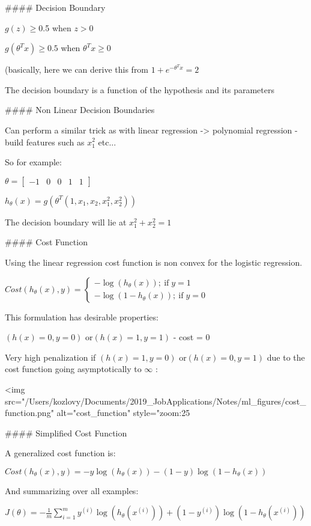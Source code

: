 #### Decision Boundary

$g(z) \ge 0$.5 when $z>0$ 

$g(\theta^T x ) \ge 0.5$ when $\theta^Tx \ge 0$

(basically, here we  can derive this from $1+e^{-\theta^T x}  = 2$

The decision boundary is a function of the hypothesis and its parameters

#### Non Linear Decision Boundaries

Can perform a similar trick as with linear regression -> polynomial regression - build features such as $x_1^2$ etc...

So for example: 

$\theta = \left[ \begin{matrix} -1 & 0 & 0  & 1 & 1 \end{matrix} \right]$ 

$h_\theta(x) = g(\theta^T(1,x_1,x_2,x_1^2,x_2^2 )) $

The decision boundary will lie at $x_1^2 + x_2^2 = 1$

#### Cost Function

Using the linear regression cost function is non convex for the logistic regression.

$Cost(h_\theta(x),y) = \begin{cases} -\log(h_\theta(x))  ;\ \text{if} \;  y=1 \\ -\log(1-h_\theta(x))   ;\ \text{if} \;  y=0  \end{cases}$

This formulation has desirable properties: 

$(h(x)=0, y = 0)$ or$(h(x) = 1, y = 1)$  - cost = 0

Very high penalization if $(h(x)=1, y = 0)$ or$(h(x) = 0, y = 1)$ due to the cost function going asymptotically to $\infty$ :

<img src="/Users/kozlovy/Documents/2019_JobApplications/Notes/ml_figures/cost_function.png" alt="cost_function" style="zoom:25%

#### Simplified Cost Function

A generalized cost function is: 

$Cost(h_\theta (x), y) =-y\log(h_\theta(x))-(1-y)\log(1-h_\theta(x))  $

And summarizing over all examples:

$J(\theta)= -\frac{1}{m} \sum_{i=1}^{m} y^{(i)}\log(h_\theta(x^{(i)}))+(1-y^{(i)})\log(1-h_\theta(x^{(i)}))$

